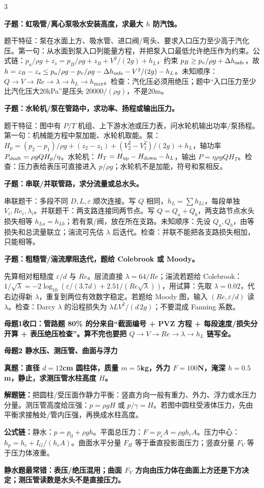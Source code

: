 \documentclass[a4paper]{article}
\newcommand{\mt}[1]{\vspace{0.22pt}\colorbox{M}{\parbox{\dimexpr\linewidth-2\fboxsep}{\color{white}\bfseries #1}}\par}
\newcommand{\qt}[1]{\vspace{0.10pt}\colorbox{Q}{\parbox{\dimexpr\linewidth-2\fboxsep}{\color{white}\bfseries #1}}\par}
\newcommand{\ans}[1]{\colorbox{G}{\parbox{\dimexpr\linewidth-2\fboxsep}{#1}}\par}
\newcommand{\warn}[1]{\colorbox{Y}{\parbox{\dimexpr\linewidth-2\fboxsep}{\color{E}\bfseries #1}}\par}
\newcommand{\chain}[1]{{\color{A}\bfseries 解题链：}#1\par}
\newcommand{\form}[1]{{\color{M}\bfseries 公式链：}#1\par}
\begin{document}
\begin{multicols}{3}
\qt{子题：虹吸管/离心泵吸水安装高度，求最大 $h$ 防汽蚀。}
\ans{题干特征：泵在水面上方、吸水管、进口阀/弯头、要求入口压力至少高于汽化压。第一句：从水面到泵入口列能量方程，并把泵入口最低允许绝压作为约束。公式链：$p_a/\rho g+z_s=p_B/\rho g+z_B+V^2/(2g)+h_L$，约束 $p_B\ge p_v/\rho g+\Delta h_{\rm safe}$，故 $h=z_B-z_s\le p_a/\rho g-p_v/\rho g-\Delta h_{\rm safe}-V^2/(2g)-h_L$。未知顺序：$Q\to V\to Re\to\lambda\to h_L\to h_{\max}$。检查：汽化压必须用绝压；题中“入口压力至少比汽化压大20kPa”是压头 $20000/(\rho g)$，不是20m。}
\qt{子题：水轮机/泵在管路中，求功率、扬程或输出压力。}
\ans{题干特征：图中有 $P/T$ 机组、上下游水池或压力表，问水轮机输出功率/泵扬程。第一句：机械能方程中泵加能、水轮机取能。泵：$H_p=(p_2-p_1)/\rho g+(z_2-z_1)+(V_2^2-V_1^2)/(2g)+h_L$，轴功率 $P_{\rm shaft}=\rho gQH_p/\eta$。水轮机：$H_T=H_{\rm up}-H_{\rm down}-h_L$，输出 $P=\eta\rho gQH_T$。检查：压力表给表压可直接进入 $p/\rho g$；水轮机不是加能，符号和泵相反。}
\qt{子题：串联/并联管路，求分流量或总水头。}
\ans{串联题干：多段不同 $D,L,\varepsilon$ 顺次连接。写 $Q$ 相同，$h_L=\sum h_{Li}$，每段单独 $V_i,Re_i,\lambda_i$。并联题干：两支路连接同两节点。写 $Q=Q_a+Q_b$，两支路节点水头损失相等 $h_{La}=h_{Lb}$；若有泵/阀，放在所在支路。未知顺序：先设 $Q_a,Q_b$，由等损失和总流量联立；湍流可先估 $\lambda$ 后迭代。检查：并联不能把各支路损失相加，只能相等。}
\qt{子题：粗糙管/湍流摩阻迭代，题给 Colebrook 或 Moody。}
\ans{先算相对粗糙度 $\varepsilon/d$ 与 $Re$。层流直接 $\lambda=64/Re$；湍流若题给 Colebrook：$1/\sqrt{\lambda}=-2\log_{10}(\varepsilon/(3.7d)+2.51/(Re\sqrt{\lambda}))$，用试算：先取 $\lambda=0.02$，代右边得新 $\lambda$，重复到两位有效数字稳定。若题给 Moody 图，输入 $(Re,\varepsilon/d)$ 读 $\lambda$。检查：Darcy $\lambda$ 的沿程损失为 $\lambda L V^2/(d\,2g)$；不要混成 Fanning 系数。}
\warn{母题1收口：管路题 80\% 的分来自“截面编号 + PVZ 方程 + 每段速度/损失分开算 + 表压绝压检查”。算不完也要把 $Q\to V\to Re\to\lambda\to h_L$ 链写全。}

\mt{母题2 静水压、测压管、曲面与浮力}
\qt{真题：直径 $d=12$cm 圆柱体，质量 $m=5$kg，外力 $F=100$N，淹深 $h=0.5$m，静止，求测压管水柱高度 $H$。}
\chain{把圆柱/受压面作静力平衡：竖直方向一般有重力、外力、浮力或水压力分量。测压管高度给压强：$p=\rho gH$ 或 $p/\gamma=H$。若图中圆柱受液体压力，先由平衡求接触处/管内压强，再换成水柱高度。}
\form{静水：$p=p_0+\rho gh$。平面总压力：$F=p_cA=\rho gh_cA$。压力中心：$h_p=h_c+I_G/(h_cA)$。曲面水平分量 $F_H$ 等于垂直投影面压力；竖直分量 $F_V$ 等于压力体液重。}
\warn{静水题最常错：表压/绝压混用；曲面 $F_V$ 方向由压力体在曲面上方还是下方决定；测压管读数是水头不是直接压力。}


\end{multicols}
\end{document}
